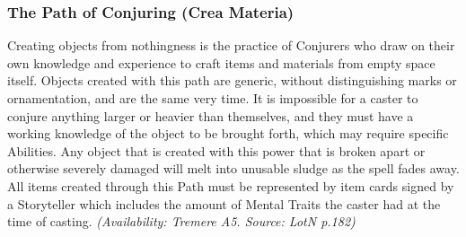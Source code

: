 \subsubsection{The Path of Conjuring (Crea Materia)}
Creating objects from nothingness is the practice of Conjurers who draw on their own knowledge and experience 
to craft items and materials from empty space itself.  Objects created with this path are generic, without 
distinguishing marks or ornamentation, and are the same very time.  It is impossible for a caster to conjure 
anything larger or heavier than themselves, and they must have a working knowledge of the object to be brought 
forth, which may require specific Abilities.  Any object that is created with this power that is broken apart 
or otherwise severely damaged will melt into unusable sludge as the spell fades away.  All items created through 
this Path must be represented by item cards signed by a Storyteller which includes the amount of Mental Traits the 
caster had at the time of casting.  \emph{(Availability: Tremere A5.  Source: LotN p.182)}

